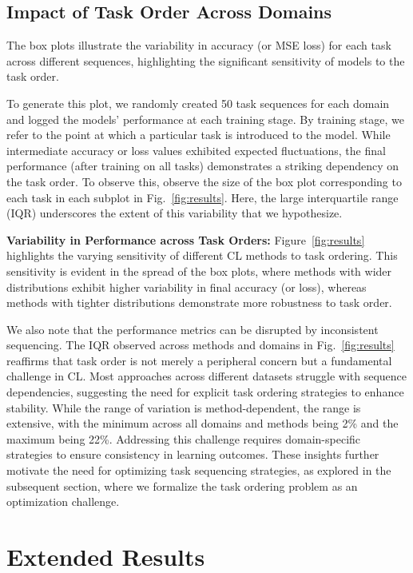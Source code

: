 \subsection{Impact of Task Order Across Domains}
The box plots illustrate the variability in accuracy (or MSE loss) for each task across different sequences, highlighting the significant sensitivity of models to the task order.

To generate this plot, we randomly created 50 task sequences for each domain and logged the models' performance at each training stage. By training stage, we refer to the point at which a particular task is introduced to the model. While intermediate accuracy or loss values exhibited expected fluctuations, the final performance (after training on all tasks) demonstrates a striking dependency on the task order. To observe this, observe the size of the box plot corresponding to each task in each subplot in Fig.~\ref{fig:results}. Here,  the large interquartile range (IQR) underscores the extent of this variability that we hypothesize.

\textbf{Variability in Performance across Task Orders:}
Figure~\ref{fig:results} highlights the varying sensitivity of different CL methods to task ordering. This sensitivity is evident in the spread of the box plots, where methods with wider distributions exhibit higher variability in final accuracy (or loss), whereas methods with tighter distributions demonstrate more robustness to task order. %

We also note that the performance metrics can be disrupted by inconsistent sequencing. The IQR observed across methods and domains in Fig.~\ref{fig:results} reaffirms that task order is not merely a peripheral concern but a fundamental challenge in CL. Most approaches across different datasets struggle with sequence dependencies, suggesting the need for explicit task ordering strategies to enhance stability. While the range of variation is method-dependent, the range is extensive, with the minimum across all domains and methods being 2\% and the maximum being 22\%. Addressing this challenge requires domain-specific strategies to ensure consistency in learning outcomes. These insights further motivate the need for optimizing task sequencing strategies, as explored in the subsequent section, where we formalize the task ordering problem as an optimization challenge.

\section{Extended Results}
\label{app:extended-results}

